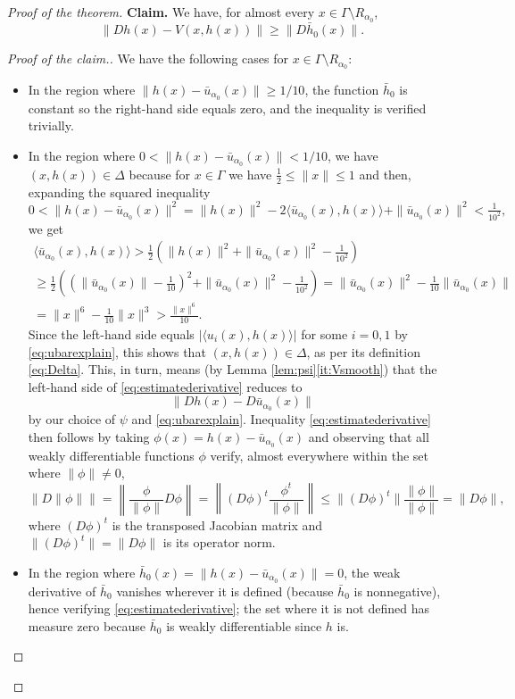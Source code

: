 \documentclass{article}
\theoremstyle{definition}
\theoremstyle{remark}
\newcommand{\denomxi}{10}
\newcommand{\uu}{u}
\begin{document}
\begin{proof}[Proof of the theorem]
\noindent\textbf{Claim.} We have, for almost every $x\in \Gamma\setminus R_{\alpha_0}$,
\begin{equation}\label{eq:estimatederivative}
 \|Dh(x)-V(x,h(x))\|\geq \|D\bar h_0(x)\|.
\end{equation}
\begin{proof}[Proof of the claim.] We have the following cases for $x\in\Gamma\setminus R_{\alpha_0}$:
\begin{itemize}
\item In the region where $\|h(x)-\bar \uu_{{\alpha_0}}(x)\|\geq 1/\denomxi$, the function $\bar h_0$ is constant so the right-hand side equals zero, and the inequality is verified trivially.
\item In the region where $0< \|h(x)-\bar \uu_{{\alpha_0}}(x)\|< 1/\denomxi$, we have $(x,h(x))\in \Delta$ because for $x\in\Gamma$ we have $\frac12\leq \|x\|\leq1$ and then, expanding the squared inequality 
\[0< \|h(x)-\bar \uu_{{\alpha_0}}(x)\|^2=\|h(x)\|^2-2\langle \bar \uu_{{\alpha_0}}(x),h(x)\rangle+\|\bar \uu_{{\alpha_0}}(x)\|^2< \tfrac{1}{\denomxi^2},\] 
we get
\begin{multline*}
\langle\bar \uu_{\alpha_0}(x),h(x)\rangle>\tfrac12(\|h(x)\|^2+\|\bar \uu_{\alpha_0}(x)\|^2-\tfrac1{10^2})\\
 \geq\tfrac12((\|\bar \uu_{\alpha_0}(x)\|-\tfrac1{10})^2+\|\bar \uu_{\alpha_0}(x)\|^2-\tfrac1{10^2})=\|\bar \uu_{\alpha_0}(x)\|^2-\tfrac1{10}\|\bar \uu_{\alpha_0}(x)\|\\
 =\|x\|^6-\tfrac1{10}\|x\|^3>\frac{\|x\|^6}{10}.
\end{multline*}
Since the left-hand side equals $|\langle \uu_i(x),h(x)\rangle|$ for some $i=0,1$ by \eqref{eq:ubarexplain}, this shows that $(x,h(x))\in \Delta$, as per its definition \eqref{eq:Delta}.
%
This, in turn, means (by Lemma \ref{lem:psi}\ref{it:Vsmooth}) that the left-hand side of \eqref{eq:estimatederivative} reduces to \[\|Dh(x)-D\bar \uu_{\alpha_0}(x)\|\]
by our choice of $\psi$ and \eqref{eq:ubarexplain}.
%
%
Inequality  \eqref{eq:estimatederivative} then  follows by taking $\phi(x)=h(x)-\bar \uu_{\alpha_0}(x)$ and observing that all weakly differentiable functions $\phi$ verify, almost everywhere within the set where $\|\phi\|\neq 0$,
\[ \Big\|D\|\phi\|\Big\|=\left\|\frac{\phi}{\|\phi\|}D\phi\right\|=\left\|(D\phi)^t\frac{\phi^t}{\|\phi\|}\right\|\leq\|(D\phi)^t\| \frac{\|\phi\|}{\|\phi\|}=\|D\phi\|,\]
where $(D\phi)^t$ is the transposed Jacobian matrix and $\|(D\phi)^t\|=\|D\phi\|$ is its operator norm.
\item In the region where $ \bar h_0(x)=\|h(x)-\bar \uu_{{\alpha_0}}(x)\|=0$, %
 the weak derivative of $\bar h_0$ vanishes wherever it is defined (because $\bar h_0$ is nonnegative), hence verifying \eqref{eq:estimatederivative}; the set where it is not defined has measure zero because $\bar h_0$ is weakly differentiable since $h$ is.
%
\end{itemize}
\end{proof}



\end{proof}
\end{document}
